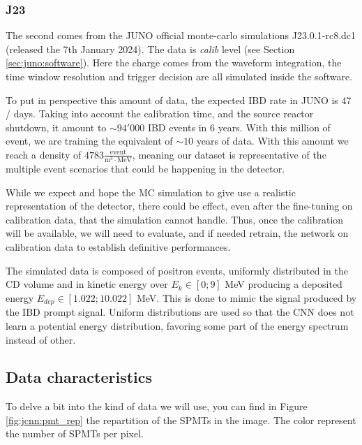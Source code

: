 \documentclass[../main.tex]{subfiles}
\begin{document}
{{\subsubsection{J23}

The second comes from the JUNO official monte-carlo simulations J23.0.1-rc8.dc1 (released the 7th January 2024). The data is \textit{calib} level (see Section \ref{sec:juno:software}). Here the charge comes from the waveform integration, the time window resolution and trigger decision are all simulated inside the software.

To put in perspective this amount of data, the expected IBD rate in JUNO is 47 / days. Taking into account the calibration time, and the source reactor shutdown, it amount to $\sim 94'000$ IBD events in 6 years. With this million of event, we are training the equivalent of $\sim 10$ years of data. With this amount we reach a density of $4783 \frac{\mathrm{event}}{\mathrm{m}^3\cdot\mathrm{MeV}}$, meaning our dataset is representative of the multiple event scenarios that could be happening in the detector.

While we expect and hope the MC simulation to give use a realistic representation of the detector, there could be effect, even after the fine-tuning on calibration data, that the simulation cannot handle. Thus, once the calibration will be available, we will need to evaluate, and if needed retrain, the network on calibration data to establish definitive performances.

The simulated data is composed of positron events, uniformly distributed in the CD volume and in kinetic energy over $E_k \in [0; 9]$ MeV producing a deposited energy $E_{dep} \in [1.022; 10.022]$ MeV. This is done to mimic the signal produced by the IBD prompt signal. Uniform distributions are used so that the CNN does not learn a potential energy distribution, favoring some part of the energy spectrum instead of other.

\subsection{Data characteristics}

To delve a bit into the kind of data we will use, you can find in Figure \ref{fig:jcnn:pmt_rep} the repartition of the SPMTs in the image. The color represent the number of SPMTs per pixel.

}}
\end{document}
